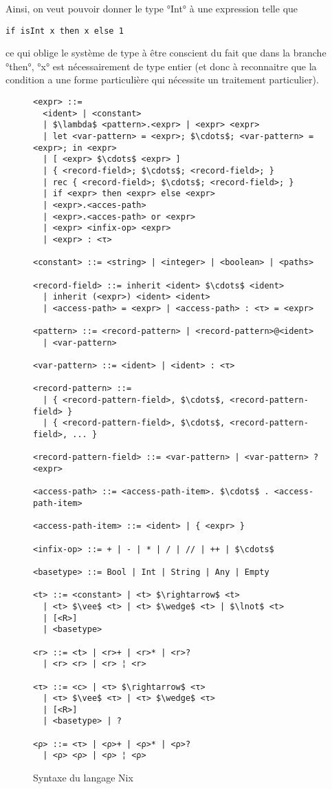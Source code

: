 Ainsi, on veut pouvoir donner le type °Int° à une expression telle que

\begin{lstlisting}
if isInt x then x else 1
\end{lstlisting}

ce qui oblige le système de type à être conscient du fait que dans la branche
°then°, °x° est nécessairement de type entier (et donc à reconnaitre que la
condition a une forme particulière qui nécessite un traitement particulier).

\begin{figure}
  \small
  \begin{lstlisting}
<expr> ::=
  <ident> | <constant>
  | $\lambda$ <pattern>.<expr> | <expr> <expr>
  | let <var-pattern> = <expr>; $\cdots$; <var-pattern> = <expr>; in <expr>
  | [ <expr> $\cdots$ <expr> ]
  | { <record-field>; $\cdots$; <record-field>; }
  | rec { <record-field>; $\cdots$; <record-field>; }
  | if <expr> then <expr> else <expr>
  | <expr>.<acces-path>
  | <expr>.<acces-path> or <expr>
  | <expr> <infix-op> <expr>
  | <expr> : <τ>

<constant> ::= <string> | <integer> | <boolean> | <paths>

<record-field> ::= inherit <ident> $\cdots$ <ident>
  | inherit (<expr>) <ident> <ident>
  | <access-path> = <expr> | <access-path> : <τ> = <expr>

<pattern> ::= <record-pattern> | <record-pattern>@<ident>
  | <var-pattern>

<var-pattern> ::= <ident> | <ident> : <τ>

<record-pattern> ::=
  | { <record-pattern-field>, $\cdots$, <record-pattern-field> }
  | { <record-pattern-field>, $\cdots$, <record-pattern-field>, ... }

<record-pattern-field> ::= <var-pattern> | <var-pattern> ? <expr>

<access-path> ::= <access-path-item>. $\cdots$ . <access-path-item>

<access-path-item> ::= <ident> | { <expr> }

<infix-op> ::= + | - | * | / | // | ++ | $\cdots$

<basetype> ::= Bool | Int | String | Any | Empty

<t> ::= <constant> | <t> $\rightarrow$ <t>
  | <t> $\vee$ <t> | <t> $\wedge$ <t> | $\lnot$ <t>
  | [<R>]
  | <basetype>

<r> ::= <t> | <r>+ | <r>* | <r>?
  | <r> <r> | <r> ¦ <r>

<τ> ::= <c> | <τ> $\rightarrow$ <τ>
  | <τ> $\vee$ <τ> | <τ> $\wedge$ <τ>
  | [<R>]
  | <basetype> | ?

<ρ> ::= <τ> | <ρ>+ | <ρ>* | <ρ>?
  | <ρ> <ρ> | <ρ> ¦ <ρ>
  \end{lstlisting}
  \caption{Syntaxe du langage Nix\label{nix::syntax}}
\end{figure}


